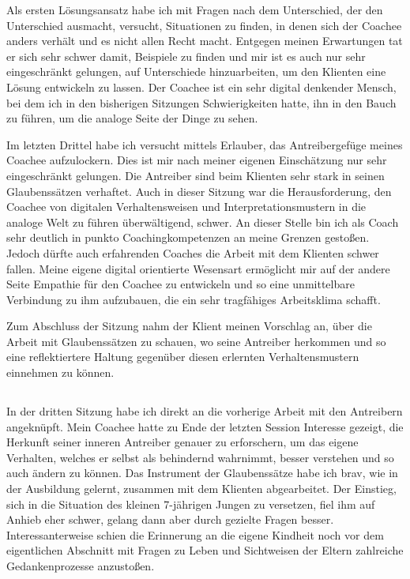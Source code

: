 \documentclass[11pt,a4paper]{article}
\begin{document}
Als ersten Lösungsansatz habe ich mit Fragen nach dem Unterschied, der den Unterschied ausmacht, versucht, Situationen zu finden, in denen sich der Coachee anders verhält und es nicht allen Recht macht. Entgegen meinen Erwartungen tat er sich sehr schwer damit, Beispiele zu finden und mir ist es auch nur sehr eingeschränkt gelungen, auf Unterschiede hinzuarbeiten, um den Klienten eine Lösung entwickeln zu lassen. Der Coachee ist ein sehr digital denkender Mensch, bei dem ich in den bisherigen Sitzungen Schwierigkeiten hatte, ihn in den Bauch zu führen, um die analoge Seite der Dinge zu sehen.

Im letzten Drittel habe ich versucht mittels Erlauber, das Antreibergefüge meines Coachee aufzulockern. Dies ist mir nach meiner eigenen Einschätzung nur sehr eingeschränkt gelungen. Die Antreiber sind beim Klienten sehr stark in seinen Glaubenssätzen verhaftet. Auch in dieser Sitzung war die Herausforderung, den Coachee von digitalen Verhaltensweisen und Interpretationsmustern in die analoge Welt zu führen überwältigend, schwer. An dieser Stelle bin ich als Coach sehr deutlich in punkto Coachingkompetenzen an meine Grenzen gestoßen. Jedoch dürfte auch erfahrenden Coaches die Arbeit mit dem Klienten schwer fallen. Meine eigene digital orientierte Wesensart ermöglicht mir auf der andere Seite Empathie für den Coachee zu entwickeln und so eine unmittelbare Verbindung zu ihm aufzubauen, die ein sehr tragfähiges Arbeitsklima schafft.


Zum Abschluss der Sitzung nahm der Klient meinen Vorschlag an, über die Arbeit mit Glaubenssätzen zu schauen, wo seine Antreiber herkommen und so eine reflektiertere Haltung gegenüber diesen erlernten Verhaltensmustern einnehmen zu können.




\subsection*{\color{Orange}{Dritte Sitzung: Glaubenssätze}}


In der dritten Sitzung habe ich direkt an die vorherige Arbeit mit den Antreibern angeknüpft. Mein Coachee hatte zu Ende der letzten Session Interesse gezeigt, die Herkunft seiner inneren Antreiber genauer zu erforschern, um das eigene Verhalten, welches er selbst als behindernd wahrnimmt, besser verstehen und so auch ändern zu können. Das Instrument der Glaubenssätze habe ich brav, wie in der Ausbildung gelernt, zusammen mit dem Klienten abgearbeitet. Der Einstieg, sich in die Situation des kleinen 7-jährigen Jungen zu versetzen, fiel ihm auf Anhieb eher schwer, gelang dann aber durch gezielte Fragen besser. Interessanterweise schien die Erinnerung an die eigene Kindheit noch vor dem eigentlichen Abschnitt mit Fragen zu Leben und Sichtweisen der Eltern zahlreiche Gedankenprozesse anzustoßen.
\end{document}
